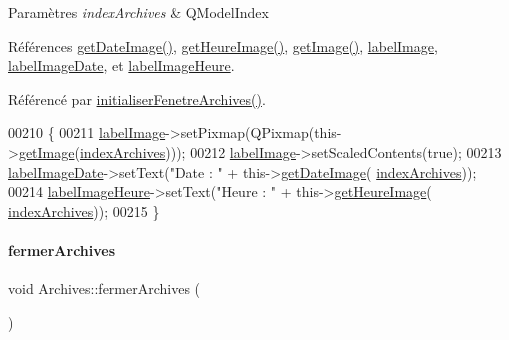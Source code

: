 \begin{DoxyParams}{Paramètres}
{\em index\+Archives} & Q\+Model\+Index \\
\hline
\end{DoxyParams}


Références \hyperlink{class_archives_a5c1d731519acde8b59bc79973c4c1287}{get\+Date\+Image()}, \hyperlink{class_archives_a91604a37aa9d4024ed79a71b12438003}{get\+Heure\+Image()}, \hyperlink{class_archives_a9e35a0ff2d5823819cd2a9f8019c7b33}{get\+Image()}, \hyperlink{class_archives_af311679d957985d956a4ee5ad28a5988}{label\+Image}, \hyperlink{class_archives_accb81477f1edca94691ae630ddc1f3f9}{label\+Image\+Date}, et \hyperlink{class_archives_ab678af24ff4c67b8791ab52e998c79cb}{label\+Image\+Heure}.



Référencé par \hyperlink{class_archives_a1842ebad3721929949bc07be5144b79c}{initialiser\+Fenetre\+Archives()}.


\begin{DoxyCode}
00210 \{
00211     \hyperlink{class_archives_af311679d957985d956a4ee5ad28a5988}{labelImage}->setPixmap(QPixmap(this->\hyperlink{class_archives_a9e35a0ff2d5823819cd2a9f8019c7b33}{getImage}(\hyperlink{class_archives_a31cba52f3979585ee5e2b9390d21322b}{indexArchives})));
00212     \hyperlink{class_archives_af311679d957985d956a4ee5ad28a5988}{labelImage}->setScaledContents(\textcolor{keyword}{true});
00213     \hyperlink{class_archives_accb81477f1edca94691ae630ddc1f3f9}{labelImageDate}->setText(\textcolor{stringliteral}{"Date : "} + this->\hyperlink{class_archives_a5c1d731519acde8b59bc79973c4c1287}{getDateImage}(
      \hyperlink{class_archives_a31cba52f3979585ee5e2b9390d21322b}{indexArchives}));
00214     \hyperlink{class_archives_ab678af24ff4c67b8791ab52e998c79cb}{labelImageHeure}->setText(\textcolor{stringliteral}{"Heure : "} + this->\hyperlink{class_archives_a91604a37aa9d4024ed79a71b12438003}{getHeureImage}(
      \hyperlink{class_archives_a31cba52f3979585ee5e2b9390d21322b}{indexArchives}));
00215 \}
\end{DoxyCode}
\mbox{\label{class_archives_a0001d8b6a783f1f424965832e89a1f6f}} 
\paragraph{\texorpdfstring{fermer\+Archives}{fermerArchives}}
{\footnotesize\ttfamily void Archives\+::fermer\+Archives (\begin{DoxyParamCaption}{ }\end{DoxyParamCaption})\hspace{0.3cm}{\ttfamily [slot]}}



